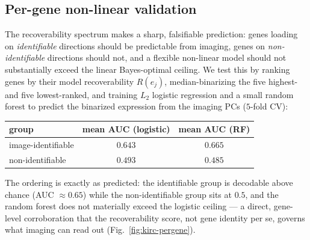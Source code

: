 \documentclass{article}
\begin{document}
\subsection{Per-gene non-linear validation}
\label{sec:kirc-pergene}
The recoverability spectrum makes a sharp, falsifiable prediction: genes
loading on \emph{identifiable} directions should be predictable from imaging,
genes on \emph{non-identifiable} directions should not, and a flexible
non-linear model should not substantially exceed the linear Bayes-optimal
ceiling. We test this by ranking genes by their model recoverability $R(e_j)$,
median-binarizing the five highest- and five lowest-ranked, and training $L_2$
logistic regression and a small random forest to predict the binarized
expression from the imaging PCs ($5$-fold CV):
\begin{center}
\begin{tabular}{lcc}
\toprule
group               & mean AUC (logistic) & mean AUC (RF) \\
\midrule
image-identifiable  & $0.643$ & $0.665$ \\
non-identifiable    & $0.493$ & $0.485$ \\
\bottomrule
\end{tabular}
\end{center}
The ordering is exactly as predicted: the identifiable group is decodable above
chance (AUC $\approx 0.65$) while the non-identifiable group sits at $0.5$, and
the random forest does not materially exceed the logistic ceiling --- a direct,
gene-level corroboration that the recoverability score, not gene identity per
se, governs what imaging can read out (Fig.~\ref{fig:kirc-pergene}).
\end{document}
